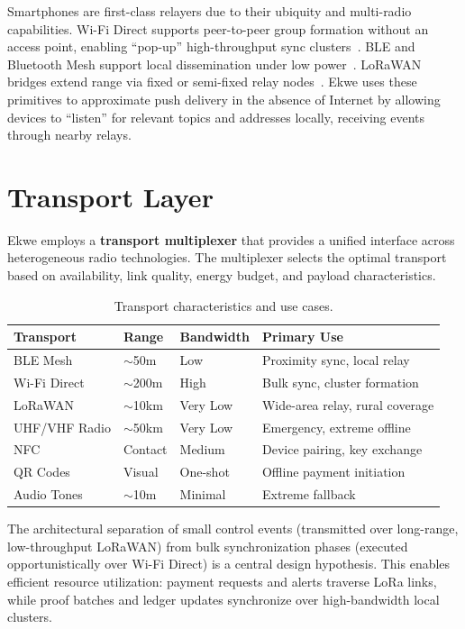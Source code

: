 \documentclass[11pt,a4paper]{article}
\begin{document}
Smartphones are first-class relayers due to their ubiquity and multi-radio capabilities. Wi-Fi Direct supports peer-to-peer group formation without an access point, enabling ``pop-up'' high-throughput sync clusters~\cite{wifi_p2p}. BLE and Bluetooth Mesh support local dissemination under low power~\cite{bt_mesh}. LoRaWAN bridges extend range via fixed or semi-fixed relay nodes~\cite{lorawan}. Ekwe uses these primitives to approximate push delivery in the absence of Internet by allowing devices to ``listen'' for relevant topics and addresses locally, receiving events through nearby relays.

\section{Transport Layer}

Ekwe employs a \textbf{transport multiplexer} that provides a unified interface across heterogeneous radio technologies. The multiplexer selects the optimal transport based on availability, link quality, energy budget, and payload characteristics.

\begin{table}[H]
\centering
\caption{Transport characteristics and use cases.}
\label{tab:transports}
\begin{tabular}{@{}llll@{}}
\toprule
\textbf{Transport} & \textbf{Range} & \textbf{Bandwidth} & \textbf{Primary Use} \\
\midrule
BLE Mesh & $\sim$50m & Low & Proximity sync, local relay \\
Wi-Fi Direct & $\sim$200m & High & Bulk sync, cluster formation \\
LoRaWAN & $\sim$10km & Very Low & Wide-area relay, rural coverage \\
UHF/VHF Radio & $\sim$50km & Very Low & Emergency, extreme offline \\
NFC & Contact & Medium & Device pairing, key exchange \\
QR Codes & Visual & One-shot & Offline payment initiation \\
Audio Tones & $\sim$10m & Minimal & Extreme fallback \\
\bottomrule
\end{tabular}
\end{table}

The architectural separation of small control events (transmitted over long-range, low-throughput LoRaWAN) from bulk synchronization phases (executed opportunistically over Wi-Fi Direct) is a central design hypothesis. This enables efficient resource utilization: payment requests and alerts traverse LoRa links, while proof batches and ledger updates synchronize over high-bandwidth local clusters.
\end{document}
